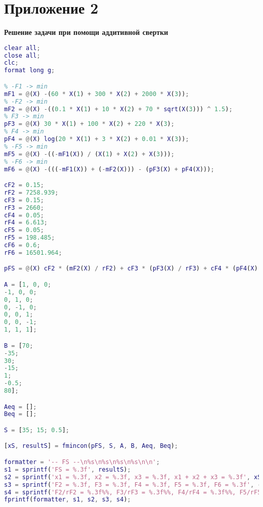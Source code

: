\section*{Приложение 2} \label{p1:2}
\textbf{Решение задачи при помощи аддитивной свертки}
\begin{lstlisting}[language={matlab}, caption={Решение задачи при помощи аддитивной свертки}, label={lst:0}, basicstyle={\footnotesize\ttfamily}, breaklines={true}]
clear all;
close all; 
clc;
format long g;

% -F1 -> min
mF1 = @(X) -(60 * X(1) + 300 * X(2) + 2000 * X(3));
% -F2 -> min
mF2 = @(X) -((0.1 * X(1) + 10 * X(2) + 70 * sqrt(X(3))) ^ 1.5);
% F3 -> min
pF3 = @(X) 30 * X(1) + 100 * X(2) + 220 * X(3);
% F4 -> min
pF4 = @(X) log(20 * X(1) + 3 * X(2) + 0.01 * X(3));
% -F5 -> min
mF5 = @(X) -((-mF1(X)) / (X(1) + X(2) + X(3)));
% -F6 -> min
mF6 = @(X) -(((-mF1(X)) + (-mF2(X))) - (pF3(X) + pF4(X)));

cF2 = 0.15;
rF2 = 7258.939;
cF3 = 0.15;
rF3 = 2660;
cF4 = 0.05;
rF4 = 6.613;
cF5 = 0.05;
rF5 = 198.485;
cF6 = 0.6;
rF6 = 16501.964;

pFS = @(X) cF2 * (mF2(X) / rF2) + cF3 * (pF3(X) / rF3) + cF4 * (pF4(X) / rF4) + cF5 * (mF5(X) / rF5) + cF6 * (mF6(X) / rF6);

A = [1, 0, 0;
-1, 0, 0;
0, 1, 0;
0, -1, 0;
0, 0, 1;
0, 0, -1;
1, 1, 1];

B = [70;
-35;
30;
-15;
1;
-0.5;
80];

Aeq = [];
Beq = [];

S = [35; 15; 0.5];

[xS, resultS] = fmincon(pFS, S, A, B, Aeq, Beq);

formatter = '-- FS --\n%s\n%s\n%s\n%s\n\n';
s1 = sprintf('FS = %.3f', resultS);
s2 = sprintf('x1 = %.3f, x2 = %.3f, x3 = %.3f, x1 + x2 + x3 = %.3f', xS, sum(xS));
s3 = sprintf('F2 = %.3f, F3 = %.3f, F4 = %.3f, F5 = %.3f, F6 = %.3f', -mF2(xS), pF3(xS), pF4(xS), -mF5(xS), -mF6(xS));
s4 = sprintf('F2/rF2 = %.3f%%, F3/rF3 = %.3f%%, F4/rF4 = %.3f%%, F5/rF5 = %.3f%%, F6/rF6 = %.3f%%', -mF2(xS) / rF2 * 100, pF3(xS) / rF3 * 100, pF4(xS) / rF4 * 100, -mF5(xS) / rF5 * 100, -mF6(xS) / rF6 * 100);
fprintf(formatter, s1, s2, s3, s4);
\end{lstlisting}

